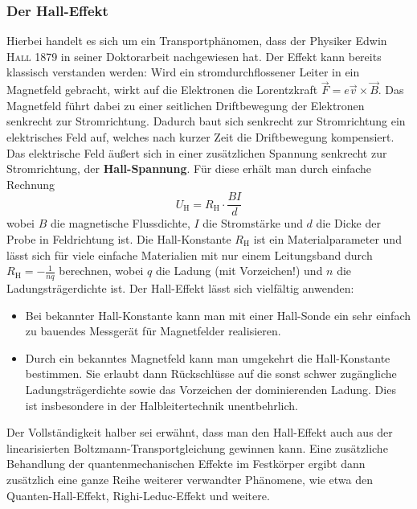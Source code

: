 \documentclass[german,  %
parskip=full,  %
]{scrartcl}
\begin{document}
\subsubsection{Der Hall-Effekt}
Hierbei handelt es sich um ein Transportphänomen, dass der Physiker Edwin \textsc{Hall} 1879 in seiner Doktorarbeit nachgewiesen hat. Der Effekt kann bereits klassisch verstanden werden: Wird ein stromdurchflossener Leiter in ein Magnetfeld gebracht, wirkt auf die Elektronen die Lorentzkraft \(\vec{F} = e\vec{v}\times\vec{B}\). Das Magnetfeld führt dabei zu einer seitlichen Driftbewegung der Elektronen senkrecht zur Stromrichtung. Dadurch baut sich senkrecht zur Stromrichtung ein elektrisches Feld auf, welches nach kurzer Zeit die Driftbewegung kompensiert. Das elektrische Feld äußert sich in einer zusätzlichen Spannung senkrecht zur Stromrichtung, der \textbf{Hall-Spannung}. Für diese erhält man durch einfache Rechnung
\[U_{\mathrm{H}} = R_{\mathrm{H}}\cdot\frac{BI}{d}\]
wobei \(B\) die magnetische Flussdichte, \(I\) die Stromstärke und \(d\) die Dicke der Probe in Feldrichtung ist. Die Hall-Konstante \(R_{\mathrm{H}}\) ist ein Materialparameter und lässt sich für viele einfache Materialien mit nur einem Leitungsband durch \(R_{\mathrm{H}} = -\frac{1}{nq}\) berechnen, wobei \(q\) die Ladung (mit Vorzeichen!) und \(n\) die Ladungsträgerdichte ist. Der Hall-Effekt lässt sich vielfältig anwenden:
\begin{itemize}
\item Bei bekannter Hall-Konstante kann man mit einer Hall-Sonde ein sehr einfach zu bauendes Messgerät für Magnetfelder realisieren. 
\item Durch ein bekanntes Magnetfeld kann man umgekehrt die Hall-Konstante bestimmen. Sie erlaubt dann Rückschlüsse auf die sonst schwer zugängliche Ladungsträgerdichte sowie das Vorzeichen der dominierenden Ladung. Dies ist insbesondere in der Halbleitertechnik unentbehrlich.
\end{itemize}
Der Vollständigkeit halber sei erwähnt, dass man den Hall-Effekt auch aus der linearisierten Boltzmann-Transportgleichung gewinnen kann. Eine zusätzliche Behandlung der quantenmechanischen Effekte im Festkörper ergibt dann zusätzlich eine ganze Reihe weiterer verwandter Phänomene, wie etwa den Quanten-Hall-Effekt, Righi-Leduc-Effekt und weitere.
\end{document}
